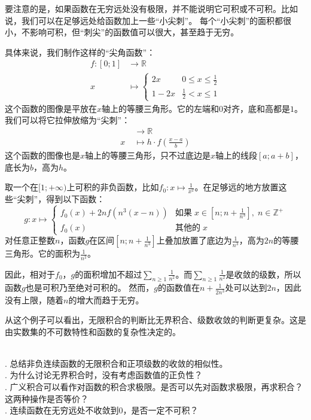 \documentclass[12pt,UTF8,fontset=none]{ctexbook}
\begin{document}
要注意的是，如果函数在无穷远处没有极限，并不能说明它可积或不可积。比如说，我们可以在足够远处给函数加上一些“小尖刺”。
每个“小尖刺”的面积都很小，不影响可积，但“刺尖”的函数值可以很大，甚至趋于无穷。

具体来说，我们制作这样的“尖角函数”：
\begin{align*}
    f: [0;1] &\rightarrow \mathbb{R} \\
x \;&\mapsto \begin{cases}
    2x & 0\leqslant x \leqslant \frac{1}{2} \\
    1 - 2x & \frac{1}{2} < x \leqslant 1
\end{cases} 
\end{align*}
这个函数的图像是平放在$x$轴上的等腰三角形。它的左端和$0$对齐，底和高都是$1$。我们可以将它拉伸放缩为“尖刺”：
\begin{align*}
   [a;a+b] &\rightarrow \mathbb{R} \\
    x \;&\mapsto h\cdot f\left(\frac{x-a}{b}\right)
\end{align*}
这个函数的图像也是$x$轴上的等腰三角形，只不过底边是$x$轴上的线段$[a;a+b]$，底长为$b$，高为$h$。

取一个在$[1;+\infty)$上可积的非负函数，比如$\displaystyle f_0: x\mapsto \frac{1}{x^2}$。在足够远的地方放置这些“尖刺”，得到以下函数：
$$
g: x\mapsto \begin{cases}
    \displaystyle f_0(x) + 2n f\left(n^3(x - n)\right) & \mbox{如果}\; x \in \left[n;n+\frac{1}{n^3}\right],\; n\in\mathbb{Z}^+ \\
    f_0(x) & \mbox{其他的}\;x
\end{cases}
$$
对任意正整数$n$，函数$g$在区间$\left[n;n+\frac{1}{n^3}\right]$上叠加放置了底边为$\frac{1}{n^3}$，高为$2n$的等腰三角形。它的面积为$\frac{1}{n^2}$。

因此，相对于$f_0$，$g$的面积增加不超过$\displaystyle \sum_{n\geqslant 1} \frac{1}{n^2}$。而$\displaystyle \sum_{n\geqslant 1} \frac{1}{n^2}$是收敛的级数，所以函数$g$也是可积乃至绝对可积的。
然而，$g$的函数值在$n+\frac{1}{2n^3}$处可以达到$2n$，因此没有上限，随着$n$的增大而趋于无穷。

从这个例子可以看出，无限积合的判断比无界积合、级数收敛的判断更复杂。这是由实数集的不可数特性和函数的复杂性决定的。

\begin{sk}
    \mbox{} \\
    . 总结非负连续函数的无限积合和正项级数的收敛的相似性。\\
    . 为什么讨论无界积合时，没有考虑函数值的正负性？\\
    . 广义积合可以看作对函数的积合求极限。是否可以先对函数求极限，再求积合？这两种操作是否等价？\\
    . 连续函数在无穷远处不收敛到$0$，是否一定不可积？
\end{sk}
\end{document}
